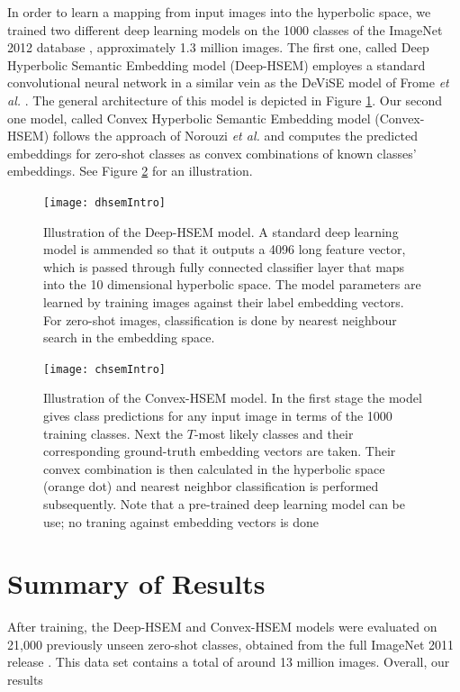 \documentclass[12pt]{report}
\begin{document}
In order to learn a mapping from input images into the hyperbolic space, we trained two different deep learning models on the 1000 classes of the ImageNet 2012 database \cite{JiaDeng2009}, approximately 1.3 million images. The first one, called Deep Hyperbolic Semantic Embedding model (Deep-HSEM) employes a standard convolutional neural network in a similar vein as the DeViSE model of Frome \textit{et al.} \cite{Frome2013}. The general architecture of this model is depicted in Figure \ref{fig:dhsemIntro}. Our second one model, called Convex Hyperbolic Semantic Embedding model (Convex-HSEM) follows the approach of Norouzi \textit{et al.} \cite{Norouzi2013} and computes the predicted embeddings for zero-shot classes as convex combinations of known classes' embeddings. See Figure \ref{fig:chsemIntro} for an illustration.

\begin{figure}
  \centering
	\texttt{[image: dhsemIntro]}
	\caption{Illustration of the Deep-HSEM model. A standard deep learning model is ammended so that it outputs a 4096 long feature vector, which is passed through fully connected classifier layer that maps into the 10 dimensional hyperbolic space. The model parameters are learned by training images against their label embedding vectors. For zero-shot images, classification is done by nearest neighbour search in the embedding space.}
	\label{fig:dhsemIntro}
\end{figure}

\begin{figure}
  \centering
	\texttt{[image: chsemIntro]}
	\caption{Illustration of the Convex-HSEM model. In the first stage the model gives class predictions for any input image in terms of the 1000 training classes. Next the $T$-most likely classes and their corresponding ground-truth embedding vectors are taken. Their convex combination is then calculated in the hyperbolic space (orange dot) and nearest neighbor classification is performed subsequently. Note that a pre-trained deep learning model can be use; no traning against embedding vectors is done}
	\label{fig:chsemIntro}
\end{figure}

\section{Summary of Results}

After training, the Deep-HSEM and Convex-HSEM models were evaluated on 21,000 previously unseen zero-shot classes, obtained from the full ImageNet 2011 release \cite{JiaDeng2009}. This data set contains a total of around 13 million images. Overall, our results
\end{document}
